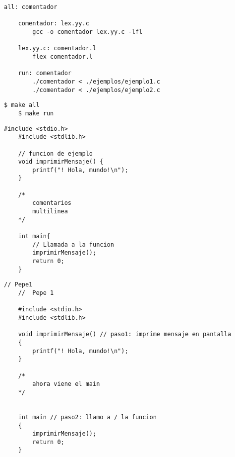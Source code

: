 \documentclass{article}
\begin{document}
        \begin{lstlisting}[frame=single, caption={(a) Makefile}, captionpos=b, title=(a) Makefile]
    all: comentador

    comentador: lex.yy.c
        gcc -o comentador lex.yy.c -lfl
            
    lex.yy.c: comentador.l
        flex comentador.l
            
    run: comentador
        ./comentador < ./ejemplos/ejemplo1.c
        ./comentador < ./ejemplos/ejemplo2.c
\end{lstlisting}
    

    \begin{lstlisting}[frame=single, caption={Ejemplo de ejecución}, captionpos=b, title=(b) Ejemplo de ejecución]
    $ make all 
    $ make run 
\end{lstlisting}

            \vspace{\baselineskip} %
    
        \lstset{language=C, breaklines=true, basicstyle=\footnotesize}
        \begin{lstlisting}[frame=single, caption={Ejemplo1.c}, title= (c) Ejemplo1.c]       
    #include <stdio.h>
    #include <stdlib.h>
                
    // funcion de ejemplo
    void imprimirMensaje() {
        printf("! Hola, mundo!\n");
    }

    /*
        comentarios
        multilinea
    */

    int main{
        // Llamada a la funcion
        imprimirMensaje();
        return 0;
    }
\end{lstlisting}
\newpage
\begin{lstlisting}[frame=single, caption={Ejemplo2.c}, title=(d) Ejemplo2.c]  
    // Pepe1
    //  Pepe 1
    
    #include <stdio.h>
    #include <stdlib.h>
    
    void imprimirMensaje() // paso1: imprime mensaje en pantalla
    {
        printf("! Hola, mundo!\n");
    }
    
    /*
        ahora viene el main
    */
    
    
    int main // paso2: llamo a / la funcion
    {
        imprimirMensaje(); 
        return 0;
    }          
\end{lstlisting}
\end{document}
